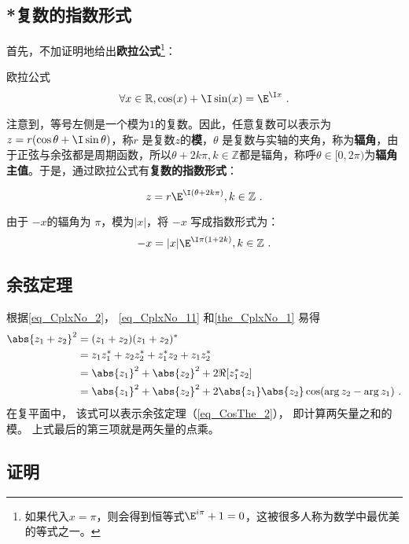 \subsection{*复数的指数形式}

首先，不加证明地给出\textbf{欧拉公式}\footnote{如果代入$x=\pi$，则会得到恒等式$\E^{i\pi}+1=0$，这被很多人称为数学中最优美的等式之一。}：

\begin{theorem}{欧拉公式}
\begin{equation}
\forall x\in\mathbb{R},\cos(x) + \I\sin(x)=\E^{\I x} ~.
\end{equation}
\end{theorem}

注意到，等号左侧是一个模为$1$的复数。因此，任意复数可以表示为 $z = r (\cos \theta + \I \sin \theta)$，称$r$ 是复数$z$的\textbf{模}，$\theta$ 是复数与实轴的夹角，称为\textbf{辐角}，由于正弦与余弦都是周期函数，所以$\theta+2k\pi,k\in\mathbb{Z}$都是辐角，称呼$\theta\in[0,2\pi)$为\textbf{辐角主值}。于是，通过欧拉公式有\textbf{复数的指数形式}：

\begin{equation}
z = r \E^{\I(\theta+2k\pi)},k\in\mathbb{Z}~.
\end{equation}

由于 $-x$的辐角为 $\pi$，模为$|x|$，将 $-x$ 写成指数形式为：
\begin{equation}
-x = |x| \E^{\I\pi(1+2k)},k\in\mathbb{Z}~.
\end{equation}


\subsection{余弦定理}
根据\autoref{eq_CplxNo_2}， \autoref{eq_CplxNo_11}  和\autoref{the_CplxNo_1} 易得
\begin{equation}
\begin{aligned}
\abs{z_1 + z_2}^2 &= (z_1 + z_2)(z_1 + z_2)^*\\
&= z_1z_1^* + z_2z_2^* + z_1^* z_2 + z_1 z_2^*\\
&= \abs{z_1}^2 + \abs{z_2}^2 + 2\Re[z_1^* z_2]\\
&= \abs{z_1}^2 + \abs{z_2}^2 + 2\abs{z_1}\abs{z_2}\cos(\arg z_2 - \arg z_1)~.
\end{aligned}
\end{equation}
在复平面中， 该式可以表示余弦定理（\autoref{eq_CosThe_2}）， 即计算两矢量之和的模。 上式最后的第三项就是两矢量的点乘。


\subsection{证明}\label{sub_CplxNo_1}

